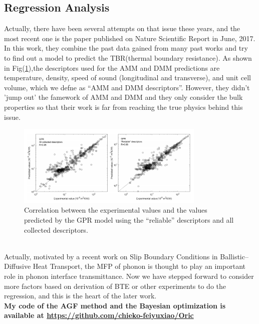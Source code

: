 \subsection{Regression Analysis}
Actually, there have been several attempts on that issue these years, and the most recent one is the paper\cite{zhan2017prediction} published on Nature Scientific Report in June, 2017. In this work, they combine the past data gained from many past works and try to find out a model to predict the TBR(thermal boundary
resistance). As shown in Fig(\ref{fig:TBR}),the descriptors used for the AMM and DMM predictions are temperature, density, speed of sound (longitudinal and transverse), and unit cell volume, which we defne as “AMM and DMM descriptors”. However, they didn't 'jump out' the famework of AMM and DMM and they only consider the bulk properties so that their work is far from reaching the true physics behind this issue. 
\begin{figure}
\centering
\includegraphics[width=0.8\textwidth]{TBR.png}
\caption{Correlation between the experimental values and the values predicted by the GPR model using the
“reliable” descriptors and all collected descriptors\cite{zhan2017prediction}.}
\label{fig:TBR}
\end{figure}\\
\indent Actually, motivated by a recent work\cite{hua2017slip} on Slip Boundary Conditions in Ballistic–Diffusive Heat Transport, the MFP of phonon is thought to play an important role in phonon interface transmittance. Now we have stepped forward to consider more factors based on derivation of BTE or other experiments to do the regression, and this is the heart of the later work.\\

\textbf{My code of the AGF method and the Bayesian optimization is available at \url{https://github.com/chieko-feiyuxiao/Oric}}